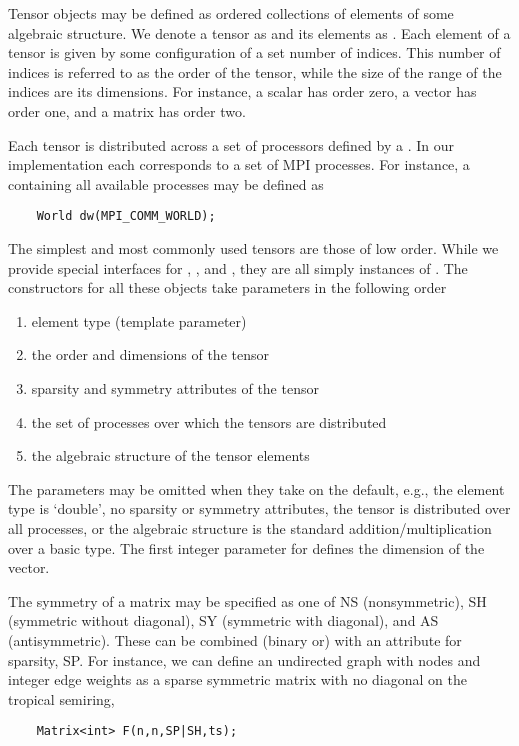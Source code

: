 Tensor objects may be defined as ordered collections of elements of some algebraic structure.
We denote a tensor as  and its elements as .
Each element of a tensor is given by some configuration of a set number of indices.
This number of indices is referred to as the order of the tensor, while the size of the range of the indices are its dimensions.
For instance, a scalar has order zero, a vector has order one, and a matrix has order two.

Each tensor is distributed across a set of processors defined by a {}.
In our implementation each {} corresponds to a set of MPI processes.
For instance, a {} containing all available processes may be defined as
\begin{lstlisting}
    World dw(MPI_COMM_WORLD);
\end{lstlisting}





The simplest and most commonly used tensors are those of low order.
While we provide special interfaces for {}, {}, and {}, they are all simply instances of {}.
The constructors for all these objects take parameters in the following order
\begin{enumerate}
\item element type (template parameter)
\item the order and dimensions of the tensor
\item sparsity and symmetry attributes of the tensor
\item the set of processes over which the tensors are distributed
\item the algebraic structure of the tensor elements
\end{enumerate}
The parameters may be omitted when they take on the default, e.g., the element type is `double', no sparsity or symmetry attributes, the tensor is distributed over all processes, or the algebraic structure is the standard addition/multiplication over a basic type.
The first integer parameter for {} defines the dimension of the vector.


The symmetry of a matrix may be specified as one of
NS (nonsymmetric), SH (symmetric without diagonal), SY (symmetric with diagonal), and AS (antisymmetric).
These can be combined (binary or) with an attribute for sparsity, SP.
For instance, we can define an undirected graph with  nodes and integer edge weights as a sparse  symmetric matrix with no diagonal on the tropical semiring,
\begin{lstlisting}
    Matrix<int> F(n,n,SP|SH,ts);
\end{lstlisting}




